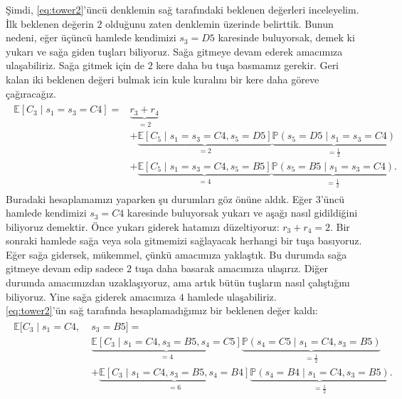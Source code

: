 \c{S}imdi, \eqref{eq:tower2}'\"{u}nc\"{u} denklemin sa\u{g} taraf{\i}ndaki
beklenen de\u{g}erleri inceleyelim. \.Ilk beklenen de\u{g}erin $2$ oldu\u{g}unu
zaten denklemin \"{u}zerinde belirttik. Bunun nedeni, e\u{g}er
\"u\c{c}\"{u}nc\"{u} hamlede kendimizi $s_3 = D5$ karesinde buluyorsak, demek ki
yukar{\i} ve sa\u{g}a giden tu\c{s}lar{\i} biliyoruz. Sa\u{g}a gitmeye devam
ederek amac{\i}m{\i}za ula\c{s}abiliriz. Sa\u{g}a gitmek i\c{c}in de $2$ kere
daha bu tu\c{s}a basmam{\i}z gerekir. Geri kalan iki beklenen de\u{g}eri bulmak
icin kule kural{\i}n{\i} bir kere daha g\"{o}reve \c{c}a\u{g}{\i}raca\u{g}{\i}z.
%
\begin{align}
    \begin{split}
    \mathbb{E}[C_3 \mid s_1=s_3=C4] = &\underbrace{r_3+r_4}_{=2} \\
    &+ \underbrace{\mathbb{E}[C_5 \mid s_1=s_3=C4, s_5=D5]}_{=2} \underbrace{\mathbb{P}(s_5=D5 \mid s_1=s_3=C4)}_{=\frac{1}{2}} \\
    &+ \underbrace{\mathbb{E}[C_5 \mid s_1=s_3=C4, s_5=B5]}_{=4} \underbrace{\mathbb{P}(s_5=B5 \mid s_1=s_3=C4)}_{=\frac{1}{2}}.
    \end{split}
\end{align}
%
Buradaki hesaplamam{\i}z{\i} yaparken \c{s}u durumlar{\i} g\"{o}z \"{o}n\"{u}ne
ald{\i}k. E\u{g}er $3$'\"{u}nc\"{u} hamlede kendimizi $s_3=C4$ karesinde
buluyorsak yukar{\i} ve a\c{s}a\u{g}{\i} nas{\i}l gidildi\u{g}ini biliyoruz
demektir. \"{O}nce yukar{\i} giderek hatam{\i}z{\i} d\"{u}zeltiyoruz: $r_3 + r_4
= 2$. Bir sonraki hamlede sa\u{g}a veya sola gitmemizi sa\u{g}layacak herhangi
bir tu\c{s}a bas{\i}yoruz. E\u{g}er sa\u{g}a gidersek, m\"{u}kemmel,
\c{c}\"{u}nk\"{u} amac{\i}m{\i}za yakla\c{s}t{\i}k. Bu durumda sa\u{g}a gitmeye
devam edip sadece $2$ tu\c{s}a daha basarak amac{\i}m{\i}za ula\c{s}{\i}r{\i}z.
Di\u{g}er durumda amac{\i}m{\i}zdan uzakla\c{s}{\i}yoruz, ama art{\i}k
b\"{u}t\"{u}n tu\c{s}lar{\i}n nas{\i}l \c{c}al{\i}\c{s}t{\i}\u{g}{\i}n{\i} biliyoruz. Yine
sa\u{g}a giderek amac{\i}m{\i}za $4$ hamlede ula\c{s}abiliriz. \\
%
\eqref{eq:tower2}'\"{u}n sa\u{g} taraf{\i}nda hesaplamad{\i}\u{g}{\i}m{\i}z bir beklenen de\u{g}er kald{\i}:
%
\begin{align}
    \begin{split}
    \mathbb{E}[C_3 \mid s_1=C4, \; &s_3=B5] = \\
    &\underbrace{\mathbb{E}[C_3 \mid s_1=C4, s_3=B5, s_4=C5]}_{=4} \underbrace{\mathbb{P}(s_4=C5 \mid s_1=C4, s_3=B5)}_{=\frac{1}{2}} \\
    &+ \underbrace{\mathbb{E}[C_3 \mid s_1=C4, s_3=B5, s_4=B4]}_{=6} \underbrace{\mathbb{P}(s_4=B4 \mid s_1=C4, s_3=B5)}_{=\frac{1}{2}}.
    \end{split}
\end{align}
